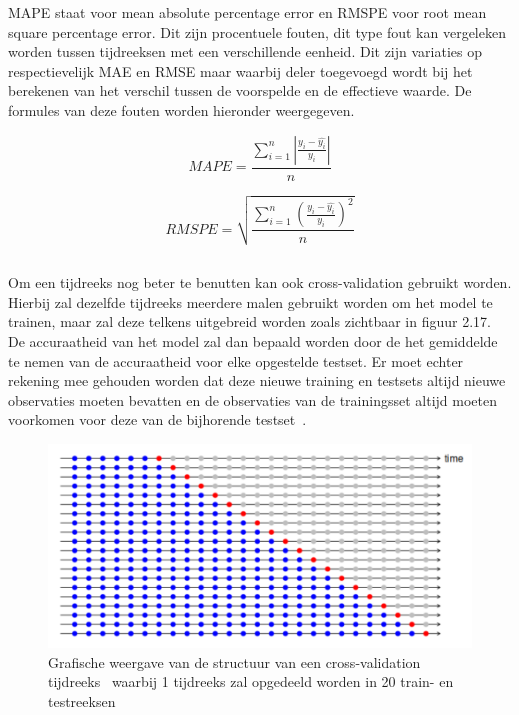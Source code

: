 MAPE staat voor mean absolute percentage error en RMSPE voor root mean square percentage error. Dit zijn procentuele fouten, dit type fout kan vergeleken worden tussen tijdreeksen met een verschillende eenheid. Dit zijn variaties op respectievelijk MAE en RMSE maar waarbij deler toegevoegd wordt bij het berekenen van het verschil tussen de voorspelde en de effectieve waarde. De formules van deze fouten worden hieronder weergegeven.

\begin{equation}
MAPE = \frac{\sum_{i=1}^{n} |\frac{y_i - \hat{y_i}}{y_i}|}{n}
\end{equation}

\begin{equation}
RMSPE = \sqrt{\frac{\sum_{i=1}^{n} (\frac{y_i - \hat{y_i}}{y_i})^2}{n}}
\end{equation}

\subsection{}

Om een tijdreeks nog beter te benutten kan ook cross-validation gebruikt worden. Hierbij zal dezelfde tijdreeks meerdere malen gebruikt worden om het model te trainen, maar zal deze telkens uitgebreid worden zoals zichtbaar in figuur 2.17. De accuraatheid van het model zal dan bepaald worden door de het gemiddelde te nemen van de accuraatheid voor elke opgestelde testset. Er moet echter rekening mee gehouden worden dat deze nieuwe training en testsets altijd nieuwe observaties moeten bevatten en de observaties van de trainingsset altijd moeten voorkomen voor deze van de bijhorende testset~\autocite{Shrivastava2020}.

\begin{figure}
    \centering
    \caption{Grafische weergave van de structuur van een cross-validation tijdreeks~\autocite{Hyndman2018} waarbij 1 tijdreeks zal opgedeeld worden in 20 train- en testreeksen}
    \label{fig:cross_validation_ts}
    \includegraphics[width=0.9\linewidth]{cross_validation_ts}
\end{figure}


